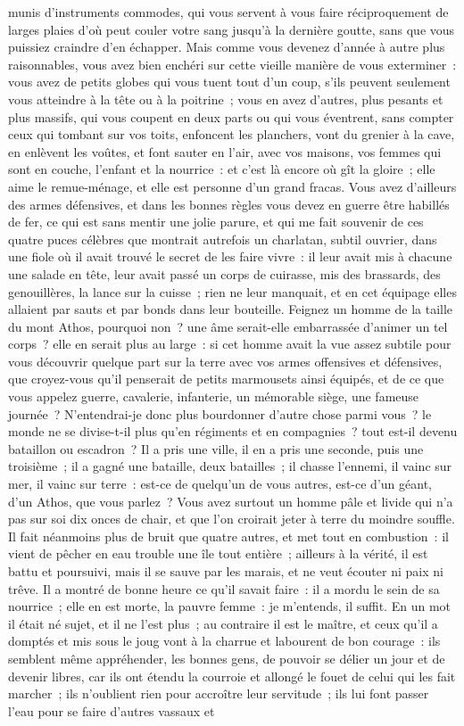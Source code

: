 \documentclass[french,twoside]{book} %
\begin{document}
munis d’instruments commodes, qui vous servent à vous faire réciproquement de larges plaies d’où peut couler votre sang jusqu’à la dernière goutte, sans que vous puissiez craindre d’en échapper. Mais comme vous devenez d’année à autre plus raisonnables, vous avez bien enchéri sur cette vieille manière de vous exterminer : vous avez de petits globes qui vous tuent tout d’un coup, s’ils peuvent seulement vous atteindre à la tête ou à la poitrine ; vous en avez d’autres, plus pesants et plus massifs, qui vous coupent en deux parts ou qui vous éventrent, sans compter ceux qui tombant sur vos toits, enfoncent les planchers, vont du grenier à la cave, en enlèvent les voûtes, et font sauter en l’air, avec vos maisons, vos femmes qui sont en couche, l’enfant et la nourrice : et c’est là encore où gît la gloire ; elle aime le remue-ménage, et elle est personne d’un grand fracas. Vous avez d’ailleurs des armes défensives, et dans les bonnes règles vous devez en guerre être habillés de fer, ce qui est sans mentir une jolie parure, et qui me fait souvenir de ces quatre puces célèbres que montrait autrefois un charlatan, subtil ouvrier, dans une fiole où il avait trouvé le secret de les faire vivre : il leur avait mis à chacune une salade en tête, leur avait passé un corps de cuirasse, mis des brassards, des genouillères, la lance sur la cuisse ; rien ne leur manquait, et en cet équipage elles allaient par sauts et par bonds dans leur bouteille. Feignez un homme de la taille du mont Athos, pourquoi non ? une âme serait-elle embarrassée d’animer un tel corps ? elle en serait plus au large : si cet homme avait la vue assez subtile pour vous découvrir quelque part sur la terre avec vos armes offensives et défensives, que croyez-vous qu’il penserait de petits marmousets ainsi équipés, et de ce que vous appelez guerre, cavalerie, infanterie, un mémorable siège, une fameuse journée ? N'entendrai-je donc plus bourdonner d’autre chose parmi vous ? le monde ne se divise-t-il plus qu’en régiments et en compagnies ? tout est-il devenu bataillon ou escadron ? Il a pris une ville, il en a pris une seconde, puis une troisième ; il a gagné une bataille, deux batailles ; il chasse l’ennemi, il vainc sur mer, il vainc sur terre : est-ce de quelqu’un de vous autres, est-ce d’un géant, d’un Athos, que vous parlez ? Vous avez surtout un homme pâle et livide qui n’a pas sur soi dix onces de chair, et que l’on croirait jeter à terre du moindre souffle. Il fait néanmoins plus de bruit que quatre autres, et met tout en combustion : il vient de pêcher en eau trouble une île tout entière ; ailleurs à la vérité, il est battu et poursuivi, mais il se sauve par les marais, et ne veut écouter ni paix ni trêve. Il a montré de bonne heure ce qu’il savait faire : il a mordu le sein de sa nourrice ; elle en est morte, la pauvre femme : je m’entends, il suffit. En un mot il était né sujet, et il ne l’est plus ; au contraire il est le maître, et ceux qu’il a domptés et mis sous le joug vont à la charrue et labourent de bon courage : ils semblent même appréhender, les bonnes gens, de pouvoir se délier un jour et de devenir libres, car ils ont étendu la courroie et allongé le fouet de celui qui les fait marcher ; ils n’oublient rien pour accroître leur servitude ; ils lui font passer l’eau pour se faire d’autres vassaux et 
\end{document}
